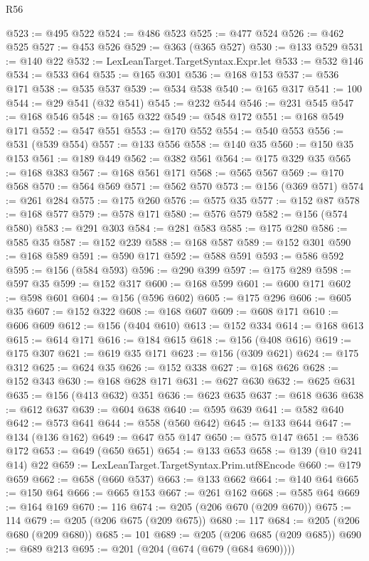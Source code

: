 \begin{lexlean}{R56}
\begin{coremodule}
@523 := @495 @522
@524 := @486 @523
@525 := @477 @524
@526 := @462 @525
@527 := @453 @526
@529 := @363 (@365 @527)
@530 := @133 @529
@531 := @140 @22
@532 := LexLeanTarget.TargetSyntax.Expr.let
@533 := @532 @146
@534 := @533 @64
@535 := @165 @301
@536 := @168 @153
@537 := @536 @171
@538 := @535 @537
@539 := @534 @538
@540 := @165 @317
@541 := 100
@544 := @29 @541 (@32 @541)
@545 := @232 @544
@546 := @231 @545
@547 := @168 @546
@548 := @165 @322
@549 := @548 @172
@551 := @168 @549 @171
@552 := @547 @551
@553 := @170 @552
@554 := @540 @553
@556 := @531 (@539 @554)
@557 := @133 @556
@558 := @140 @35
@560 := @150 @35 @153
@561 := @189 @449
@562 := @382 @561
@564 := @175 @329 @35
@565 := @168 @383
@567 := @168 @561 @171
@568 := @565 @567
@569 := @170 @568
@570 := @564 @569
@571 := @562 @570
@573 := @156 (@369 @571)
@574 := @261 @284
@575 := @175 @260
@576 := @575 @35
@577 := @152 @87
@578 := @168 @577
@579 := @578 @171
@580 := @576 @579
@582 := @156 (@574 @580)
@583 := @291 @303
@584 := @281 @583
@585 := @175 @280
@586 := @585 @35
@587 := @152 @239
@588 := @168 @587
@589 := @152 @301
@590 := @168 @589
@591 := @590 @171
@592 := @588 @591
@593 := @586 @592
@595 := @156 (@584 @593)
@596 := @290 @399
@597 := @175 @289
@598 := @597 @35
@599 := @152 @317
@600 := @168 @599
@601 := @600 @171
@602 := @598 @601
@604 := @156 (@596 @602)
@605 := @175 @296
@606 := @605 @35
@607 := @152 @322
@608 := @168 @607
@609 := @608 @171
@610 := @606 @609
@612 := @156 (@404 @610)
@613 := @152 @334
@614 := @168 @613
@615 := @614 @171
@616 := @184 @615
@618 := @156 (@408 @616)
@619 := @175 @307
@621 := @619 @35 @171
@623 := @156 (@309 @621)
@624 := @175 @312
@625 := @624 @35
@626 := @152 @338
@627 := @168 @626
@628 := @152 @343
@630 := @168 @628 @171
@631 := @627 @630
@632 := @625 @631
@635 := @156 (@413 @632) @351
@636 := @623 @635
@637 := @618 @636
@638 := @612 @637
@639 := @604 @638
@640 := @595 @639
@641 := @582 @640
@642 := @573 @641
@644 := @558 (@560 @642)
@645 := @133 @644
@647 := @134 (@136 @162)
@649 := @647 @55 @147
@650 := @575 @147
@651 := @536 @172
@653 := @649 (@650 @651)
@654 := @133 @653
@658 := @139 (@10 @241 @14) @22
@659 := LexLeanTarget.TargetSyntax.Prim.utf8Encode
@660 := @179 @659
@662 := @658 (@660 @537)
@663 := @133 @662
@664 := @140 @64
@665 := @150 @64
@666 := @665 @153
@667 := @261 @162
@668 := @585 @64
@669 := @164 @169
@670 := 116
@674 := @205 (@206 @670 (@209 @670))
@675 := 114
@679 := @205 (@206 @675 (@209 @675))
@680 := 117
@684 := @205 (@206 @680 (@209 @680))
@685 := 101
@689 := @205 (@206 @685 (@209 @685))
@690 := @689 @213
@695 := @201 (@204 (@674 (@679 (@684 @690))))

\end{coremodule}
\end{lexlean}
